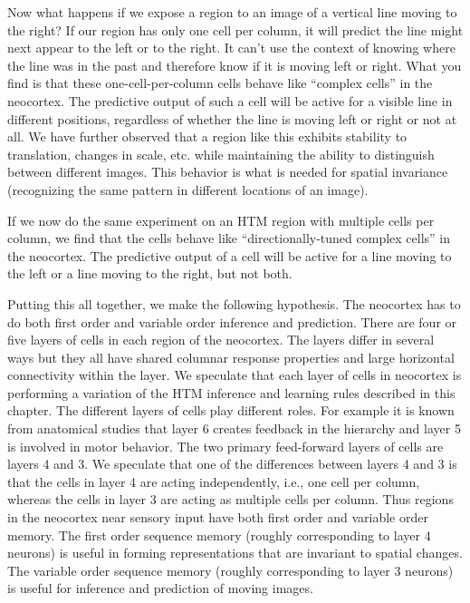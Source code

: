\documentclass{report}
\begin{document}
Now what happens if we expose a region to an image of a vertical line
moving to the right? If our region has only one cell per column, it
will predict the line might next appear to the left or to the
right. It can't use the context of knowing where the line was in the
past and therefore know if it is moving left or right. What you find
is that these one-cell-per-column cells behave like ``complex cells''
in the neocortex. The predictive output of such a cell will be active
for a visible line in different positions, regardless of whether the
line is moving left or right or not at all. We have further observed
that a region like this exhibits stability to translation, changes in
scale, etc. while maintaining the ability to distinguish between
different images. This behavior is what is needed for spatial
invariance (recognizing the same pattern in different locations of an
image).

If we now do the same experiment on an HTM region with multiple cells
per column, we find that the cells behave like ``directionally-tuned
complex cells'' in the neocortex. The predictive output of a cell will
be active for a line moving to the left or a line moving to the right,
but not both.

Putting this all together, we make the following hypothesis. The
neocortex has to do both first order and variable order inference and
prediction. There are four or five layers of cells in each region of
the neocortex. The layers differ in several ways but they all have
shared columnar response properties and large horizontal connectivity
within the layer. We speculate that each layer of cells in neocortex
is performing a variation of the HTM inference and learning rules
described in this chapter. The different layers of cells play
different roles. For example it is known from anatomical studies that
layer 6 creates feedback in the hierarchy and layer 5 is involved in
motor behavior. The two primary feed-forward layers of cells are
layers 4 and 3. We speculate that one of the differences between
layers 4 and 3 is that the cells in layer 4 are acting independently,
i.e., one cell per column, whereas the cells in layer 3 are acting as
multiple cells per column. Thus regions in the neocortex near sensory
input have both first order and variable order memory. The first order
sequence memory (roughly corresponding to layer 4 neurons) is useful
in forming representations that are invariant to spatial changes. The
variable order sequence memory (roughly corresponding to layer 3
neurons) is useful for inference and prediction of moving images.
\end{document}
